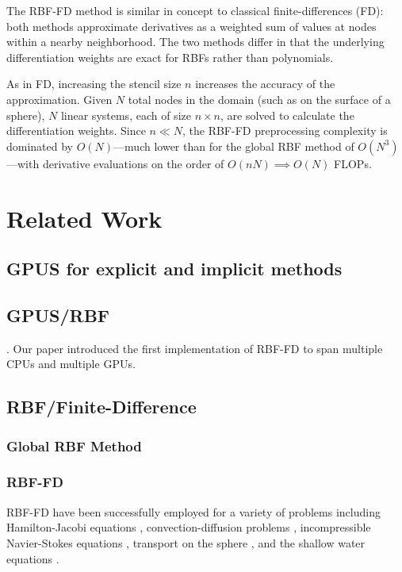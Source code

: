 The RBF-FD method is similar in concept to classical 
finite-differences (FD): both methods approximate derivatives as a weighted sum of values at nodes within a nearby neighborhood. The two methods differ in that the underlying differentiation 
weights are exact for RBFs rather than polynomials. 

As in FD, increasing the stencil size $n$  increases the accuracy of the approximation.
Given $N$ total nodes in the domain (such as on the surface of a sphere), $N$ linear systems, each of size $n \times n$, are solved to calculate the differentiation weights. Since $n \ll N$, the RBF-FD preprocessing complexity is dominated by $O(N)$---much lower than for the global RBF method of $O(N^3)$---with derivative evaluations on the order of $O(nN) \implies O(N)$ FLOPs. 

\chapter{Related Work}

\section{  GPUS for explicit and implicit methods }



\section{  GPUS/RBF }

\cite{Schmidt2009a,Schmidt2009b}. Our paper \cite{BolligFlyerErlebacher2012} introduced the first implementation of RBF-FD to span multiple CPUs and multiple GPUs. 

\section{  RBF/Finite-Difference }

\subsection{Global RBF Method}

\subsection{RBF-FD}
RBF-FD have been successfully employed for a variety of problems including Hamilton-Jacobi equations \cite{Cecil2004}, convection-diffusion problems \cite{Chandhini2007, Stevens2009b},
incompressible Navier-Stokes equations \cite{Shu2003,Chinchapatnam2009}, transport on the sphere \cite{FornbergLehto11}, and the shallow water equations \cite{FlyerLehto11}.

